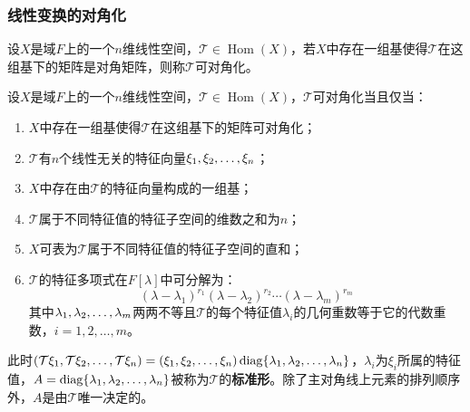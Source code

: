 \subsubsection{线性变换的对角化}
\begin{definition}
	设$X$是域$F$上的一个$n$维线性空间，$\mathcal{T}\in\operatorname{Hom}(X)$，若$X$中存在一组基使得$\mathcal{T}$在这组基下的矩阵是对角矩阵，则称$\mathcal{T}$可对角化。
\end{definition}
\begin{theorem}
	设$X$是域$F$上的一个$n$维线性空间，$\mathcal{T}\in\operatorname{Hom}(X)$，$\mathcal{T}$可对角化当且仅当：
	\begin{enumerate}
		\item $X$中存在一组基使得$\mathcal{T}$在这组基下的矩阵可对角化；
		\item $\mathcal{T}$有$n$个线性无关的特征向量$\xi_1, \xi_2, \dots, \xi_{n}$；
		\item $X$中存在由$\mathcal{T}$的特征向量构成的一组基；
		\item $\mathcal{T}$属于不同特征值的特征子空间的维数之和为$n$；
		\item $X$可表为$\mathcal{T}$属于不同特征值的特征子空间的直和；
		\item $\mathcal{T}$的特征多项式在$F[\lambda]$中可分解为：
		\begin{equation*}
			(\lambda-\lambda_1)^{r_1}(\lambda-\lambda_2)^{r_2}\cdots(\lambda-\lambda_m)^{r_m}
		\end{equation*}
		其中$\lambda_1, \lambda_2, \dots, \lambda_{m}$两两不等且$\mathcal{T}$的每个特征值$\lambda_i$的几何重数等于它的代数重数，$i=1,2,\dots,m$。
	\end{enumerate}
	此时$(\mathcal{T}\xi_1, \mathcal{T}\xi_2, \dots, \mathcal{T}\xi_{n})=(\xi_1, \xi_2, \dots, \xi_{n})\operatorname{diag}\{\lambda_1, \lambda_2, \dots, \lambda_{n}\}$，$\lambda_i$为$\xi_i$所属的特征值，$A=\operatorname{diag}\{\lambda_1, \lambda_2, \dots, \lambda_{n}\}$被称为$\mathcal{T}$的\textbf{标准形}。除了主对角线上元素的排列顺序外，$A$是由$\mathcal{T}$唯一决定的。
\end{theorem}
